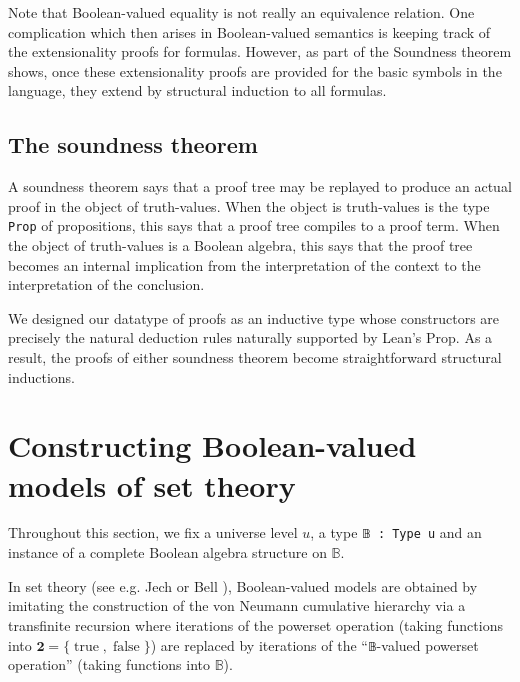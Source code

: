 \documentclass[a4paper,USenglish,cleveref, autoref]{lipics-v2019}
\newcommand{\B}{\mathbb{B}}
\begin{document}
Note that Boolean-valued equality is not really an equivalence relation. One complication which then arises in Boolean-valued semantics is keeping track of the extensionality proofs for formulas. However, as part of the Soundness theorem shows, once these extensionality proofs are provided for the basic symbols in the language, they extend by structural induction to all formulas.

\subsection{The soundness theorem}

A soundness theorem says that a proof tree may be replayed to produce an actual proof in the object of truth-values. When the object is truth-values is the type \texttt{Prop} of propositions, this says that a proof tree compiles to a proof term. When the object of truth-values is a Boolean algebra, this says that the proof tree becomes an internal implication from the interpretation of the context to the interpretation of the conclusion.

We designed our datatype of proofs as an inductive type whose constructors are precisely the natural deduction rules naturally supported by Lean's Prop. As a result, the proofs of either soundness theorem become straightforward structural inductions.


\section{Constructing Boolean-valued models of set theory}
\label{sect:bvm}
Throughout this section, we fix a universe level $u$, a type \lstinline{𝔹 : Type u} and an instance of a complete Boolean algebra structure on $\B$.

In set theory (see e.g. Jech \cite{jech1} or Bell \cite{bell1}), Boolean-valued models are obtained by imitating the construction of the von Neumann cumulative hierarchy via a transfinite recursion where iterations of the powerset operation (taking functions into $\mathbf{2} = \{\operatorname{true}, \operatorname{false}\}$) are replaced by iterations of the ``\lstinline{𝔹}-valued powerset operation'' (taking functions into $\B$).
\end{document}

